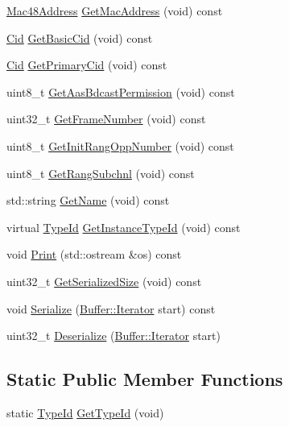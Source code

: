\begin{DoxyCompactItemize}
\item 
\hyperlink{classns3_1_1Mac48Address}{Mac48\+Address} \hyperlink{classns3_1_1RngRsp_ab90b032d59ffe4f4dd4211ce4cd74662}{Get\+Mac\+Address} (void) const 
\item 
\hyperlink{classns3_1_1Cid}{Cid} \hyperlink{classns3_1_1RngRsp_a52be3c20b754220afc197bedf51c6bb6}{Get\+Basic\+Cid} (void) const 
\item 
\hyperlink{classns3_1_1Cid}{Cid} \hyperlink{classns3_1_1RngRsp_ab53e9aecf1fc61226f2813dbd9ee4643}{Get\+Primary\+Cid} (void) const 
\item 
uint8\+\_\+t \hyperlink{classns3_1_1RngRsp_a1e61cdccd381b4315c237fe3ba514073}{Get\+Aas\+Bdcast\+Permission} (void) const 
\item 
uint32\+\_\+t \hyperlink{classns3_1_1RngRsp_ab1167716084d63e7d22b2207d011f874}{Get\+Frame\+Number} (void) const 
\item 
uint8\+\_\+t \hyperlink{classns3_1_1RngRsp_a2d2f9429b7cfdfec98e2f7d538342d39}{Get\+Init\+Rang\+Opp\+Number} (void) const 
\item 
uint8\+\_\+t \hyperlink{classns3_1_1RngRsp_a816d2340112d36c8401310a06532b653}{Get\+Rang\+Subchnl} (void) const 
\item 
std\+::string \hyperlink{classns3_1_1RngRsp_aaa0a26a9a90c664418289cb72d690714}{Get\+Name} (void) const 
\item 
virtual \hyperlink{classns3_1_1TypeId}{Type\+Id} \hyperlink{classns3_1_1RngRsp_acafe0dba5411a35351b0033ffba4749d}{Get\+Instance\+Type\+Id} (void) const 
\item 
void \hyperlink{classns3_1_1RngRsp_aae21af55ee52eafb48b60f1df6483f49}{Print} (std\+::ostream \&os) const 
\item 
uint32\+\_\+t \hyperlink{classns3_1_1RngRsp_aee9a3920d95be88f0c1ff5cbbde8fe53}{Get\+Serialized\+Size} (void) const 
\item 
void \hyperlink{classns3_1_1RngRsp_a78794099638c34db6155022b02bfba4f}{Serialize} (\hyperlink{classns3_1_1Buffer_1_1Iterator}{Buffer\+::\+Iterator} start) const 
\item 
uint32\+\_\+t \hyperlink{classns3_1_1RngRsp_a1444784acf694f3d67246fc664e79496}{Deserialize} (\hyperlink{classns3_1_1Buffer_1_1Iterator}{Buffer\+::\+Iterator} start)
\end{DoxyCompactItemize}
\subsection*{Static Public Member Functions}
\begin{DoxyCompactItemize}
\item 
static \hyperlink{classns3_1_1TypeId}{Type\+Id} \hyperlink{classns3_1_1RngRsp_a60d5d0f3ea2679bc8591509e8b353942}{Get\+Type\+Id} (void)
\end{DoxyCompactItemize}
